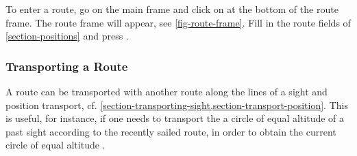 \documentclass{ol-softwaremanual}
\begin{document}
To enter a route, go on the main frame and click on  at the bottom of the route frame. The route frame will appear, see \cref{fig-route-frame}. Fill in the route fields of \cref{section-positions} and press . 

\subsubsection{Transporting a Route}\label{section-transporting-route}

A route can be transported with another route along the lines of a sight and position transport, cf. \cref{section-transporting-sight,section-transport-position}. This is useful, for instance, if one needs to transport the a  circle of equal altitude of a past sight according to the recently sailed route, in order to obtain the current circle of equal altitude \cite{bowditch2002the}. 


\pagebreak
\printacronyms[pages={display=all,seq/use=false}]


\end{document}
